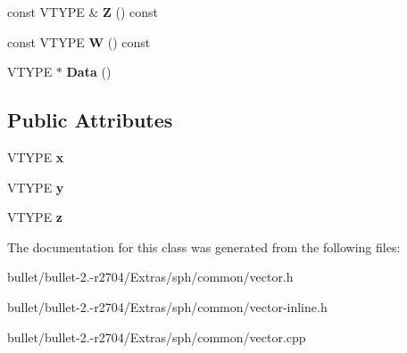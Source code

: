 \begin{DoxyCompactItemize}
\item 
\hypertarget{class_vector3_d_f_a946774ea9b7ea5b8129ca98af354503d}{const V\+T\+Y\+P\+E \& {\bfseries Z} () const }\label{class_vector3_d_f_a946774ea9b7ea5b8129ca98af354503d}

\item 
\hypertarget{class_vector3_d_f_a4c2e95653ec1cab5feccb4bf618a3279}{const V\+T\+Y\+P\+E {\bfseries W} () const }\label{class_vector3_d_f_a4c2e95653ec1cab5feccb4bf618a3279}

\item 
\hypertarget{class_vector3_d_f_a1078a24a097ff4a7de4784e94065cc81}{V\+T\+Y\+P\+E $\ast$ {\bfseries Data} ()}\label{class_vector3_d_f_a1078a24a097ff4a7de4784e94065cc81}

\end{DoxyCompactItemize}
\subsection*{Public Attributes}
\begin{DoxyCompactItemize}
\item 
\hypertarget{class_vector3_d_f_ace93f5665b2445be41c77dcd0d07b51f}{V\+T\+Y\+P\+E {\bfseries x}}\label{class_vector3_d_f_ace93f5665b2445be41c77dcd0d07b51f}

\item 
\hypertarget{class_vector3_d_f_a76758644cac36640bb42fd2020ba1939}{V\+T\+Y\+P\+E {\bfseries y}}\label{class_vector3_d_f_a76758644cac36640bb42fd2020ba1939}

\item 
\hypertarget{class_vector3_d_f_abc7ce0b799ea5803c7408679d6fce816}{V\+T\+Y\+P\+E {\bfseries z}}\label{class_vector3_d_f_abc7ce0b799ea5803c7408679d6fce816}

\end{DoxyCompactItemize}


The documentation for this class was generated from the following files\+:\begin{DoxyCompactItemize}
\item 
bullet/bullet-\/2.-\/r2704/\+Extras/sph/common/vector.\+h\item 
bullet/bullet-\/2.-\/r2704/\+Extras/sph/common/vector-\/inline.\+h\item 
bullet/bullet-\/2.-\/r2704/\+Extras/sph/common/vector.\+cpp\end{DoxyCompactItemize}
